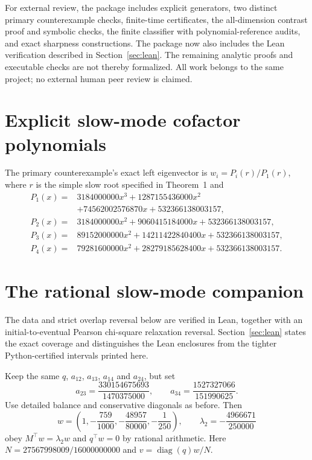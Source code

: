 \documentclass[11pt]{article}
\newcommand{\diag}{\operatorname{diag}}
\begin{document}
For external review, the package includes explicit generators, two distinct primary counterexample checks, finite-time certificates, the all-dimension contrast proof and symbolic checks, the finite classifier with polynomial-reference audits, and exact sharpness constructions. The package now also includes the Lean verification described in Section~\ref{sec:lean}. The remaining analytic proofs and executable checks are not thereby formalized. All work belongs to the same project; no external human peer review is claimed.

\section{Explicit slow-mode cofactor polynomials}\label{app:cofactors}
The primary counterexample's exact left eigenvector is $w_i=P_i(r)/P_1(r)$, where $r$ is the simple slow root specified in Theorem~1 and
\begin{align*}
P_1(x)={}&3184000000x^3+1287155436000x^2\\
&+74562002576870x+532366138003157,\\
P_2(x)={}&3184000000x^2+9060415184000x+532366138003157,\\
P_3(x)={}&89152000000x^2+14211422840400x+532366138003157,\\
P_4(x)={}&79281600000x^2+28279185628400x+532366138003157.
\end{align*}

\section{The rational slow-mode companion}\label{app:rational}
The data and strict overlap reversal below are verified in Lean, together with an initial-to-eventual Pearson chi-square relaxation reversal. Section~\ref{sec:lean} states the exact coverage and distinguishes the Lean enclosures from the tighter Python-certified intervals printed here.

Keep the same $q$, $a_{12}$, $a_{13}$, $a_{14}$ and $a_{24}$, but set
\[
a_{23}=\frac{330154675693}{1470375000},\qquad
 a_{34}=\frac{1527327066}{151990625}.
\]
Use detailed balance and conservative diagonals as before. Then
\[
w=\left(1,-\frac{759}{1000},-\frac{48957}{80000},-\frac1{250}\right),
\qquad \lambda_2=-\frac{4966671}{250000}
\]
obey $M^\top w=\lambda_2w$ and $q^\top w=0$ by rational arithmetic. Here $N=27567998009/16000000000$ and $v=\diag(q)w/N$.
\end{document}
